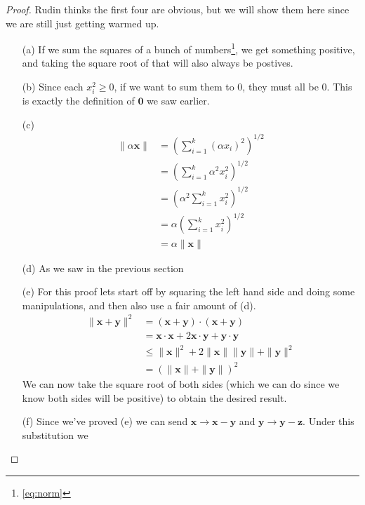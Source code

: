 \documentclass[../../templates/section]{subfiles}
\begin{document}
\begin{proof}
    Rudin thinks the first four are obvious, but we will show them here since we
    are still just getting warmed up.
    \begin{itemize}
        \item[(a)] If we sum the squares of a bunch of numbers\footnote{\ref{eq:norm}},
        we get something positive, and taking the square root of that will also
        always be postives.
        \item[(b)] Since each $x_i^2 \geq 0$, if we want to sum them to 0, they
        must all be 0. This is exactly the definition of $\mathbf{0}$ we saw
        earlier.
        \item[(c)]
        \begin{align}
            \|\alpha\mathbf{x}\| & = \left(\sum_{i=1}^k (\alpha x_i)^2\right)^{1/2} \\
            & = \left(\sum_{i=1}^k \alpha^2 x_i^2\right)^{1/2} \\
            & = \left(\alpha^2\sum_{i=1}^k x_i^2\right)^{1/2} \\
            & = \alpha\left(\sum_{i=1}^k x_i^2\right)^{1/2} \\
            & = \alpha\|\mathbf{x}\|
        \end{align}
        \item[(d)] As we saw in the previous section
        \item[(e)] For this proof lets start off by squaring the left hand side
        and doing some manipulations, and then also use a fair amount of (d).
        \begin{align}
            \|\mathbf{x} + \mathbf{y}\|^2 & = (\mathbf{x} + \mathbf{y})\cdot(\mathbf{x} + \mathbf{y}) \\
            & = \mathbf{x}\cdot\mathbf{x} + 2\mathbf{x}\cdot\mathbf{y} + \mathbf{y}\cdot\mathbf{y} \\
            & \leq \|\mathbf{x}\|^2 + 2\|\mathbf{x}\|\|\mathbf{y}\| + \|\mathbf{y}\|^2 \\
            & = \left(\|\mathbf{x}\| + \|\mathbf{y}\|\right)^2
        \end{align}
        We can now take the square root of both sides (which we can do since we
        know both sides will be positive) to obtain the desired result.
        \item[(f)] Since we've proved (e) we can send $\mathbf{x}\to\mathbf{x} - \mathbf{y}$
        and $\mathbf{y}\to\mathbf{y} - \mathbf{z}$. Under this substitution we

\end{itemize}
\end{proof}
\end{document}
